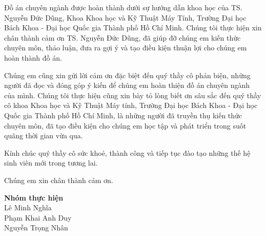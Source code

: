\begin{acknowledgments}

    Đồ án chuyên ngành được hoàn thành dưới sự hướng dẫn khoa học của TS. Nguyễn Đức Dũng, Khoa Khoa học và Kỹ Thuật Máy Tính, Trường Đại học Bách Khoa - Đại học Quốc gia Thành phố Hồ Chí Minh. Chúng tôi thực hiện xin chân thành cảm ơn TS. Nguyễn Đức Dũng, đã giúp đỡ chúng em kiến thức chuyên môn, thảo luận, đưa ra gợi ý và tạo điều kiện thuận lợi cho chúng em hoàn thành đồ án.

    Chúng em cũng xin gửi lời cảm ơn đặc biệt đến quý thầy cô phản biện, những người đã đọc và đóng góp ý kiến để chúng em hoàn thiện đồ án chuyên ngành của mình. Chúng tôi thực hiện cũng xin bày tỏ lòng biết ơn sâu sắc đến quý thầy cô khoa Khoa học và Kỹ Thuật Máy tính, Trường Đại học Bách Khoa - Đại học Quốc gia Thành phố Hồ Chí Minh, là những người đã truyền thụ kiến thức chuyên môn, đã tạo điều kiện cho chúng em học tập và phát triển trong suốt quãng thời gian vừa qua.

    Kính chúc quý thầy cô sức khoẻ, thành công và tiếp tục đào tạo những thế hệ sinh viên mới trong tương lai.

    Chúng em xin chân thành cảm ơn.

    \begin{flushright}
        \textbf{Nhóm thực hiện} \\
        Lê Minh Nghĩa \\
        Phạm Khai Anh Duy \\
        Nguyễn Trọng Nhân \\
    \end{flushright}

\end{acknowledgments}